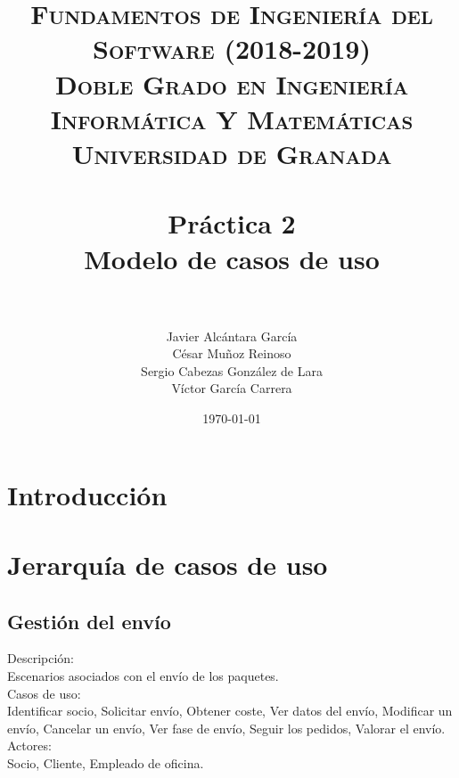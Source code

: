



\title{	
\normalfont \normalsize 
\textsc{\textbf{Fundamentos de Ingeniería del Software (2018-2019)} \\ Doble Grado en Ingeniería Informática Y Matemáticas \\ Universidad de Granada} \\ [25pt] %
\horrule{0.5pt} \\[0.4cm] %
\huge \textbf{Práctica 2} \\ Modelo de casos de uso \\ %
\horrule{2pt} \\[0.5cm] %
}

\author{Javier Alcántara García\\ César Muñoz Reinoso \\ Sergio Cabezas González de Lara \\ Víctor García Carrera} %

\date{\normalsize\today} %





\maketitle %

\newpage %

\tableofcontents %

\newpage

\section{Introducción}
\section{Jerarquía de casos de uso}
\subsection{Gestión del envío}	
Descripción:\\
Escenarios asociados con el envío de los paquetes.\\
Casos de uso:\\
 Identificar socio, Solicitar envío, Obtener coste, Ver datos del envío, Modificar un envío, Cancelar un envío, Ver fase de envío, Seguir los pedidos, Valorar el envío.\\
Actores:\\
Socio, Cliente, Empleado de oficina.\\
